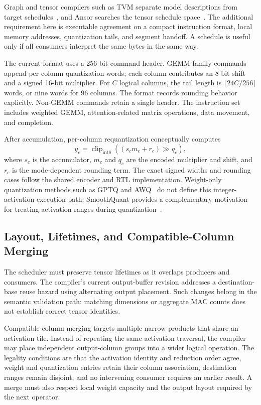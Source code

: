 \documentclass[10pt,conference,letterpaper]{IEEEtran}
\begin{document}
Graph and tensor compilers such as TVM separate model descriptions from target schedules~\cite{tvm}, and Ansor searches the tensor schedule space~\cite{ansor}. The additional requirement here is executable agreement on a compact instruction format, local memory addresses, quantization tails, and segment handoff. A schedule is useful only if all consumers interpret the same bytes in the same way.

The current format uses a 256-bit command header. GEMM-family commands append per-column quantization words; each column contributes an 8-bit shift and a signed 16-bit multiplier. For $C$ logical columns, the tail length is $\lceil24C/256\rceil$ words, or nine words for 96 columns. The format records rounding behavior explicitly. Non-GEMM commands retain a single header. The instruction set includes weighted GEMM, attention-related matrix operations, data movement, and completion.

After accumulation, per-column requantization conceptually computes
\begin{equation}
y_c=\operatorname{clip}_{\mathrm{int8}}\!\left((s_c m_c+r_c)\mathbin{\gg}q_c\right),
\end{equation}
where $s_c$ is the accumulator, $m_c$ and $q_c$ are the encoded multiplier and shift, and $r_c$ is the mode-dependent rounding term. The exact signed widths and rounding cases follow the shared encoder and RTL implementation. Weight-only quantization methods such as GPTQ and AWQ~\cite{gptq,awq} do not define this integer-activation execution path; SmoothQuant provides a complementary motivation for treating activation ranges during quantization~\cite{smooth}.

\subsection{Layout, Lifetimes, and Compatible-Column Merging}
The scheduler must preserve tensor lifetimes as it overlaps producers and consumers. The compiler's current output-buffer revision addresses a destination-base reuse hazard using alternating output placement. Such changes belong in the semantic validation path: matching dimensions or aggregate MAC counts does not establish correct tensor identities.

Compatible-column merging targets multiple narrow products that share an activation tile. Instead of repeating the same activation traversal, the compiler may place independent output-column groups into a wider logical operation. The legality conditions are that the activation identity and reduction order agree, weight and quantization entries retain their column association, destination ranges remain disjoint, and no intervening consumer requires an earlier result. A merge must also respect local weight capacity and the output layout required by the next operator.
\end{document}
